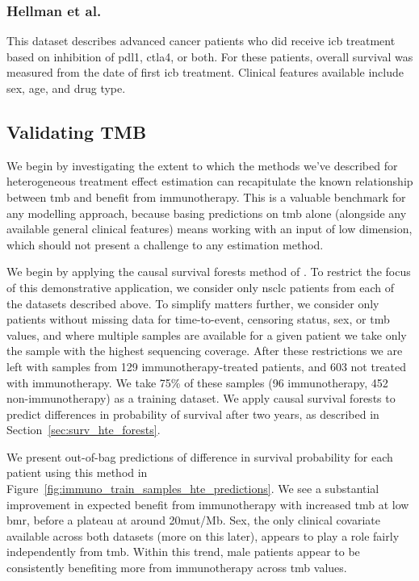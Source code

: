 \documentclass[../thesis.tex]{subfiles}
\begin{document}
\subsubsection*{Hellman et al.}
This dataset describes advanced cancer patients who did receive \gls{icb} treatment based on inhibition of \gls{pdl1}, \gls{ctla4}, or both. For these patients, overall survival was measured from the date of first \gls{icb} treatment. Clinical features available include sex, age, and drug type.

\subsection{Validating TMB}
We begin by investigating the extent to which the methods we've described for heterogeneous treatment effect estimation can recapitulate the known relationship between \gls{tmb} and benefit from immunotherapy. This is a valuable benchmark for any modelling approach, because basing predictions on \gls{tmb} alone (alongside any available general clinical features) means working with an input of low dimension, which should not present a challenge to any estimation method.

We begin by applying the causal survival forests method of \citet{cui_estimating_2022}. To restrict the focus of this demonstrative application, we consider only \gls{nsclc} patients from each of the datasets described above. To simplify matters further, we consider only patients without missing data for time-to-event, censoring status, sex, or \gls{tmb} values, and where multiple samples are available for a given patient we take only the sample with the highest sequencing coverage. After these restrictions we are left with samples from 129 immunotherapy-treated patients, and 603 not treated with immunotherapy. We take 75\% of these samples (96 immunotherapy, 452 non-immunotherapy) as a training dataset. We apply causal survival forests to predict differences in probability of survival after two years, as described in Section~\ref{sec:surv_hte_forests}.

We present out-of-bag predictions of difference in survival probability for each patient using this method in Figure~\ref{fig:immuno_train_samples_hte_predictions}. We see a substantial improvement in expected benefit from immunotherapy with increased \gls{tmb} at low \gls{bmr}, before a plateau at around 20mut/Mb. Sex, the only clinical covariate available across both datasets (more on this later), appears to play a role fairly independently from \gls{tmb}. Within this trend, male patients appear to be consistently benefiting more from immunotherapy across \gls{tmb} values.
\end{document}
